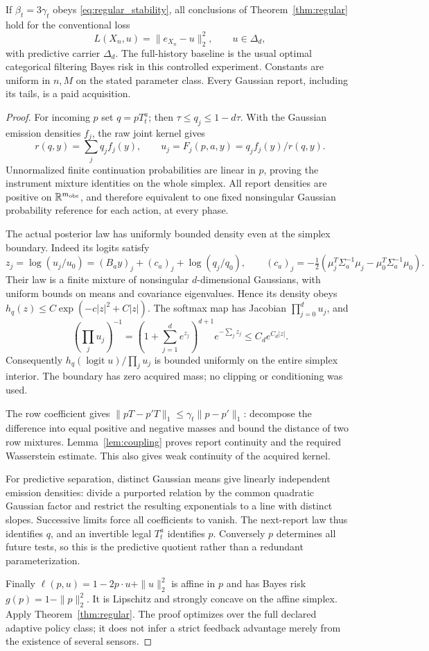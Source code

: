 \begin{theorem}\label{thm:gaussian}
If $\beta_t=3\gamma_t$ obeys \eqref{eq:regular_stability}, all conclusions of Theorem~\ref{thm:regular} hold for the conventional loss
\[
 L(X_n,u)=\|e_{X_n}-u\|_2^2,\qquad u\in\Delta_d,
\]
with predictive carrier $\Delta_d$. The full-history baseline is the usual optimal categorical filtering Bayes risk in this controlled experiment. Constants are uniform in $n,M$ on the stated parameter class. Every Gaussian report, including its tails, is a paid acquisition.
\end{theorem}
\begin{proof}
For incoming $p$ set $q=pT_t^a$; then $\tau\le q_j\le1-d\tau$. With the Gaussian emission densities $f_j$, the raw joint kernel gives
\[
 r(q,y)=\sum_jq_j f_j(y),\qquad u_j=F_j(p,a,y)=q_j f_j(y)/r(q,y).
\]
Unnormalized finite continuation probabilities are linear in $p$, proving the instrument mixture identities on the whole simplex. All report densities are positive on $\mathbb R^{m_{\rm obs}}$, and therefore equivalent to one fixed nonsingular Gaussian probability reference for each action, at every phase.

The actual posterior law has uniformly bounded density even at the simplex boundary. Indeed its logits satisfy
\[
 z_j=\log(u_j/u_0)=(B_ay)_j+(c_a)_j+\log(q_j/q_0),\qquad
 (c_a)_j=-\tfrac12(\mu_j^T\Sigma_a^{-1}\mu_j-\mu_0^T\Sigma_a^{-1}\mu_0).
\]
Their law is a finite mixture of nonsingular $d$-dimensional Gaussians, with uniform bounds on means and covariance eigenvalues. Hence its density obeys
$h_q(z)\le C\exp(-c|z|^2+C|z|)$. The softmax map has Jacobian $\prod_{j=0}^du_j$, and
\[
 (\textstyle\prod_j u_j)^{-1}
 =(1+\sum_{j=1}^d e^{z_j})^{d+1}e^{-\sum_j z_j}
 \le C_d e^{C_d|z|}.
\]
Consequently $h_q(\operatorname{logit}u)/\prod_j u_j$ is bounded uniformly on the entire simplex interior. The boundary has zero acquired mass; no clipping or conditioning was used.

The row coefficient gives $\|pT-p'T\|_1\le\gamma_t\|p-p'\|_1$: decompose the difference into equal positive and negative masses and bound the distance of two row mixtures. Lemma~\ref{lem:coupling} proves report continuity and the required Wasserstein estimate. This also gives weak continuity of the acquired kernel.

For predictive separation, distinct Gaussian means give linearly independent emission densities: divide a purported relation by the common quadratic Gaussian factor and restrict the resulting exponentials to a line with distinct slopes. Successive limits force all coefficients to vanish. The next-report law thus identifies $q$, and an invertible legal $T_t^a$ identifies $p$. Conversely $p$ determines all future tests, so this is the predictive quotient rather than a redundant parameterization.

Finally $\ell(p,u)=1-2p\cdot u+\|u\|_2^2$ is affine in $p$ and has Bayes risk $g(p)=1-\|p\|_2^2$. It is Lipschitz and strongly concave on the affine simplex. Apply Theorem~\ref{thm:regular}. The proof optimizes over the full declared adaptive policy class; it does not infer a strict feedback advantage merely from the existence of several sensors.
\end{proof}
